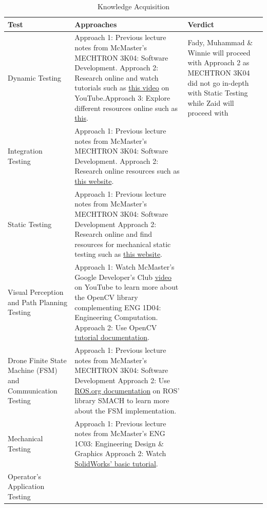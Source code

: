 \documentclass[12pt, titlepage]{article}
\begin{document}
\begin{enumerate}
  
\begin{table}[!h]
\begin{center}
\caption {Knowledge Acquisition}
\label{RequiredTesting}
\begin{tabular}{ | m{3cm} | m{7cm} | m{4cm} | }
\hline
Test & Approaches & Verdict \\
\hline
Dynamic Testing & 
Approach 1: Previous lecture notes from McMaster's MECHTRON 3K04: Software Development. \newline Approach 2: Research online and watch tutorials such as \href{https://www.youtube.com/watch?v=ePMjdL4PE5M}{this video} on YouTube.\newline Approach 3: Explore different resources online such as \href{https://www.sciencedirect.com/topics/materials-science/dynamic-mechanical-analysis}{this}.& Fady, Muhammad \& Winnie will proceed with Approach 2 as MECHTRON 3K04 did not go in-depth with Static Testing while Zaid will proceed with  \\
\hline
Integration Testing & 
Approach 1: Previous lecture notes from McMaster's MECHTRON 3K04: Software Development. \newline Approach 2: Research online resources such as \href{https://www.simplexitypd.com/blog/five-tips-for-mechatronic-system-integration}{this website}. &\\
\hline
Static Testing & 
Approach 1: Previous lecture notes from McMaster's MECHTRON 3K04: Software Development \newline Approach 2: Research online and find resources for mechanical static testing such as \href{https://musculoskeletalkey.com/6-static-dynamic-and-fatigue-mechanical-testing/}{this website}. &\\
\hline
 Visual Perception and Path Planning Testing & Approach 1: Watch McMaster's Google Developer's Club \href{https://www.youtube.com/watch?v=Zrw5eCfnSOM}{video} on YouTube to learn more about the OpenCV library complementing ENG 1D04: Engineering Computation.  \newline Approach 2: Use OpenCV \href{https://docs.opencv.org/4.x/d9/df8/tutorial_root.html}{tutorial documentation}.\\
\hline
Drone Finite State Machine (FSM) and Communication Testing & 
Approach 1: Previous lecture notes from McMaster's MECHTRON 3K04: Software Development \newline Approach 2: Use \href{http://wiki.ros.org/smach}{ROS.org documentation} on ROS' library SMACH to learn more about the FSM implementation. &\\
\hline
Mechanical Testing & Approach 1: Previous lecture notes from McMaster's ENG 1C03: Engineering Design \& Graphics \newline Approach 2: Watch \href{https://www.youtube.com/watch?v=YmMDhzXitn0}{SolidWorks' basic tutorial}.&\\  
\hline
Operator's Application Testing \\
\hline


\end{tabular}
\end{center}
\end{table}
\end{enumerate}
\end{document}

